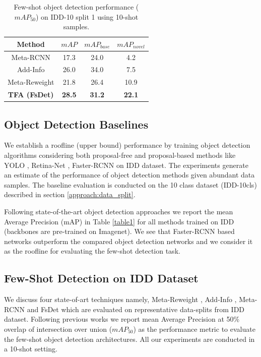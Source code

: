\documentclass[letterpaper]{article} %
\begin{document}
\begin{table}[tp]
      \caption{Few-shot object detection performance ($mAP_{50}$) on IDD-10 split 1 using 10-shot samples.}
      \centering
      \begin{tabular}{c|c|c|c}
            \hline
            Method                       & $mAP$ & $mAP_{base}$ & $mAP_{novel}$ \\
            \hline
            Meta-RCNN     & 17.3  & 24.0         & 4.2   \\
            Add-Info      & 26.0  & 34.0         & 7.5   \\
            Meta-Reweight & 21.8     & 26.4       & 10.9 \\
            \textbf{TFA (FsDet)}       & \textbf{28.5}  & \textbf{31.2} & \textbf{22.1} \\
            \hline
      \end{tabular}
      \label{table3}
\end{table}

\subsection{Object Detection Baselines}
\label{experiment:od_base}
We establish a roofline (upper bound) performance by training object detection algorithms considering both proposal-free and proposal-based methods like YOLO \cite{yolo1}, Retina-Net \cite{retinanet}, Faster-RCNN \cite{faster-rcnn} on IDD dataset. The experiments generate an estimate of the performance of object detection methods given abundant data samples. The baseline evaluation is conducted on the 10 class dataset (IDD-10cls) described in section \ref{approach:data_split}.

Following state-of-the-art object detection approaches we report the mean Average Precision (mAP) in Table \ref{table1} for all methods trained on IDD (backbones are pre-trained on Imagenet). We see that Faster-RCNN based networks outperform the compared object detection networks and we consider it as the roofline for evaluating the few-shot detection task.

\subsection{Few-Shot Detection on IDD Dataset}
\label{experiment:fsod_res}
We discuss four state-of-art techniques namely, Meta-Reweight \cite{reweight}, Add-Info \cite{addfeat}, Meta-RCNN \cite{metarcnn} and FsDet \cite{fsdet} which are evaluated on representative data-splits from IDD dataset. Following previous works we report mean Average Precision at 50\% overlap of intersection over union ($mAP_{50}$) as the performance metric to evaluate the few-shot object detection architectures. All our experiments are conducted in a 10-shot setting.
\end{document}
